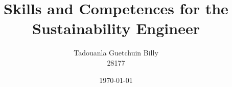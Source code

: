 \usepackage[margin=1in, top=1.2in, bottom=1.2in]{geometry}

\usepackage[T1]{fontenc}
\usepackage{lmodern}
\usepackage{microtype}

\usepackage[english]{babel}
\usepackage{amsmath, amssymb, amsthm}
\usepackage{csquotes}

\usepackage{booktabs}
\usepackage{graphicx}
\usepackage{xcolor}


\usepackage[backend=biber, style=numeric-comp, sorting=nyt, giveninits=true]{biblatex}


\usepackage[
  pdfencoding=auto,
  colorlinks=true,
  linkcolor=navyblue,
  citecolor=navyblue,
  urlcolor=navyblue
]{hyperref}

\title{Skills and Competences for the Sustainability Engineer}
\author{Tadouanla Guetchuin Billy \\ 28177}

\date{\today}
